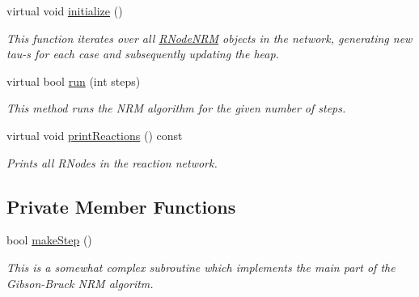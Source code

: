 \begin{DoxyCompactItemize}
virtual void \hyperlink{classchem_1_1ChemNRMImpl_a685ac34bfa4b8226045bd3b8c6cdec95}{initialize} ()
\begin{DoxyCompactList}\small\item\em This function iterates over all \hyperlink{classchem_1_1RNodeNRM}{R\-Node\-N\-R\-M} objects in the network, generating new tau-\/s for each case and subsequently updating the heap. \end{DoxyCompactList}\item 
virtual bool \hyperlink{classchem_1_1ChemNRMImpl_a236b68389599aa9486959377cfc51496}{run} (int steps)
\begin{DoxyCompactList}\small\item\em This method runs the N\-R\-M algorithm for the given number of steps. \end{DoxyCompactList}\item 
virtual void \hyperlink{classchem_1_1ChemNRMImpl_a7898a5e226789a39b51f8fb56cc85c1e}{print\-Reactions} () const 
\begin{DoxyCompactList}\small\item\em Prints all R\-Nodes in the reaction network. \end{DoxyCompactList}\end{DoxyCompactItemize}
\subsection*{Private Member Functions}
\begin{DoxyCompactItemize}
\item 
bool \hyperlink{classchem_1_1ChemNRMImpl_a9f17d2b5953fd3ffc8b5337e78021ed2}{make\-Step} ()
\begin{DoxyCompactList}\small\item\em This is a somewhat complex subroutine which implements the main part of the Gibson-\/\-Bruck N\-R\-M algoritm. \end{DoxyCompactList}\end{DoxyCompactItemize}
